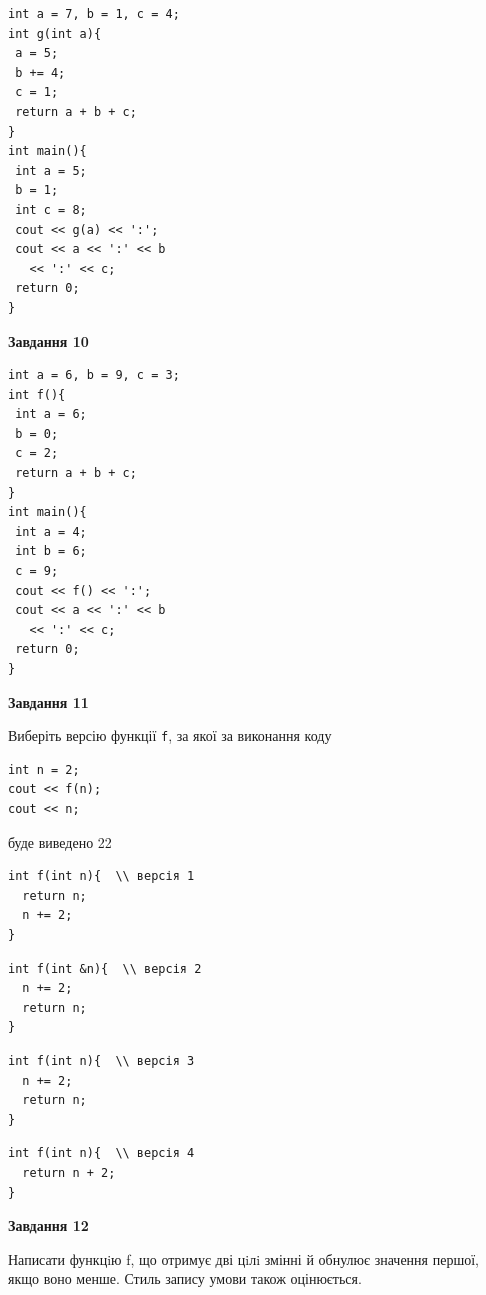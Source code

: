 \documentclass[12pt, ukrainian]{article}
\def\code#1{\Verb!#1!}
\begin{document}
{\begin {large}
\begin{minipage}[t]{7.0cm}
\begin{verbatim}
int a = 7, b = 1, c = 4;
int g(int a){
 a = 5;
 b += 4;
 c = 1;
 return a + b + c;
}
int main(){
 int a = 5;
 b = 1;
 int c = 8;
 cout << g(a) << ':';
 cout << a << ':' << b 
   << ':' << c;
 return 0;
}
\end{verbatim}



\begin{center}
\textbf{Завдання 10}
\end{center}
\vspace{-8mm}

\begin{verbatim}
int a = 6, b = 9, c = 3;
int f(){
 int a = 6;
 b = 0;
 c = 2;
 return a + b + c;
}
int main(){
 int a = 4;
 int b = 6;
 c = 9;
 cout << f() << ':';
 cout << a << ':' << b 
   << ':' << c;
 return 0;
}
\end{verbatim}

\end{minipage}
\vline \hspace{1mm}
\begin{minipage}[t]{11.0cm}

\begin{center}
\textbf{Завдання 11}
\end{center}
Виберіть версію функції \code{f}, за якої за виконання коду
\begin{verbatim}
int n = 2;
cout << f(n);
cout << n;
\end{verbatim}

буде виведено 22

\begin{verbatim}
int f(int n){  \\ версія 1
  return n;
  n += 2;
}
\end{verbatim}

\vspace{-8mm}\begin{verbatim}
int f(int &n){  \\ версія 2
  n += 2;
  return n;
}
\end{verbatim}

\vspace{-8mm}\begin{verbatim}
int f(int n){  \\ версія 3
  n += 2;
  return n;
}
\end{verbatim}

\vspace{-8mm}\begin{verbatim}
int f(int n){  \\ версія 4
  return n + 2;
}
\end{verbatim}



\begin{center}
\textbf{Завдання 12}
\end{center}

Написати функцiю f, що отримує дві цiлi змінні й обнулює значення першої, якщо воно менше. Стиль запису умови також оцінюється.\par

\end{minipage}

\end {large}}
\end{document}
